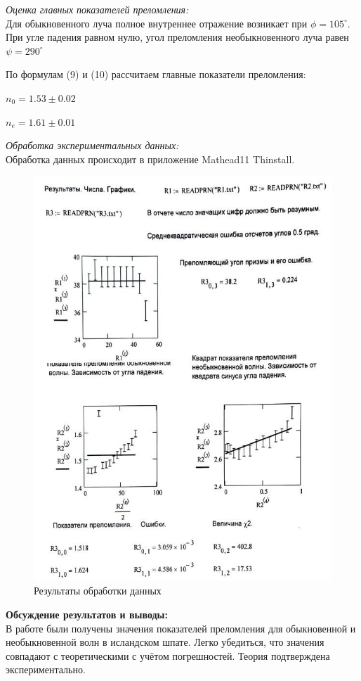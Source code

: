 \documentclass[a4paper, 12pt]{article}%
\begin{document}
	\newpage
 	\textit{Оценка главных показателей преломления:}\\
 	
 	Для обыкновенного луча полное внутреннее отражение возникает при $\phi = 105 ^\circ$.
 	При угле падения равном нулю, угол преломления необыкновенного луча равен $\psi = 290 ^\circ$
 	
 	По формулам (9) и (10) рассчитаем главные показатели преломления:\\ 
 	\begin{center}
		\underline{$n_0 = 1.53 \pm 0.02$}
		
		\underline{$n_e = 1.61 \pm 0.01$}\\
 	\end{center}
 	
 	\textit{Обработка экспериментальных данных:}\\
 	
 	Обработка данных происходит в приложение Mathead11 Thinstall.
 	
 	\begin{figure}[H]
 		\begin{center}
 			\includegraphics[width = 0.6\linewidth]{лаба.jpg}
 			\caption{Результаты обработки данных}
 		\end{center}
 		
 	\end{figure}
 	
	
	\textbf{Обсуждение результатов и выводы: }\\
	В работе были получены значения показателей преломления для обыкновенной и необыкновенной волн в исландском шпате. Легко убедиться, что значения совпадают с теоретическими с учётом погрешностей. Теория подтверждена экспериментально.
	
	
	
\end{document}
